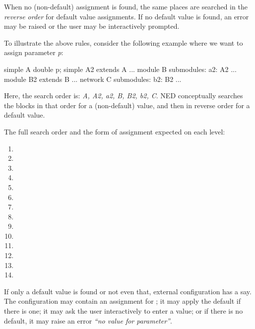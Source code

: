 When no (non-default) assignment is found, the same places are searched in the
\textit{reverse order} for default value assignments. If no default value is
found, an error may be raised or the user may be interactively prompted.

To illustrate the above rules, consider the following example where we
want to assign parameter \textit{p}:

\begin{ned}
simple A { double p; }
simple A2 extends A {...}
module B { submodules: a2: A2 {...} }
module B2 extends B {...}
network C { submodules: b2: B2 {...} }
\end{ned}

Here, the search order is: \textit{A, A2, a2, B, B2, b2, C}. NED
conceptually searches the  blocks in that order for a
(non-default) value, and then in reverse order for a default value.

The full search order and the form of assignment expected on each level:

\begin{enumerate}
  \item {}
  \item {}
  \item {}
  \item {}
  \item {}
  \item {}
  \item {}
  \item {}
  \item {}
  \item {}
  \item {}
  \item {}
  \item {}
  \item {}
\end{enumerate}

If only a default value is found or not even that, external configuration
has a say. The configuration may contain an assignment for ;
it may apply the default if there is one; it may ask the user interactively
to enter a value; or if there is no default, it may raise an error
\textit{``no value for parameter''}.



